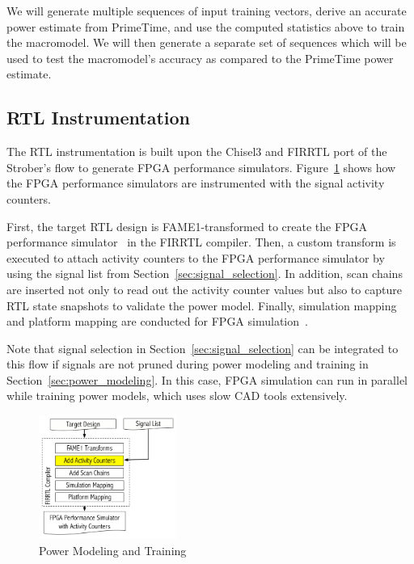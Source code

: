 We will generate multiple sequences of input training vectors, derive an accurate power estimate from PrimeTime, and use the computed statistics above to train the macromodel. We will then generate a separate set of sequences which will be used to test the macromodel's accuracy as compared to the PrimeTime power estimate.

\subsection{RTL Instrumentation}
\label{sec:instrumentation}
The RTL instrumentation is built upon the Chisel3 and FIRRTL port of the Strober's flow
to generate FPGA performance simulators. Figure~\ref{fig:power_modeling} shows how
the FPGA performance simulators are instrumented with the signal activity counters.

First, the target RTL design is FAME1-transformed to create the FPGA performance simulator~\cite{Kim2016}
in the FIRRTL compiler. Then, a custom transform is executed to attach activity counters
to the FPGA performance simulator by using the signal list from Section~\ref{sec:signal_selection}.
In addition, scan chains are inserted not only to read out the activity counter values but also to
capture RTL state snapshots to validate the power model. Finally, simulation mapping and platform mapping
are conducted for FPGA simulation~\cite{Kim2016}.

Note that signal selection in Section~\ref{sec:signal_selection} can be integrated to
this flow if signals are not pruned during power modeling and training in
Section~\ref{sec:power_modeling}. In this case, FPGA simulation can run in parallel while
training power models, which uses slow CAD tools extensively.

\begin{figure}[!ht]
	\centering
	\includegraphics[width=0.4\textwidth,height=\textheight,keepaspectratio]{images/instrumentation.pdf}
	\caption{Power Modeling and Training}
	\label{fig:power_modeling}
\end{figure}

